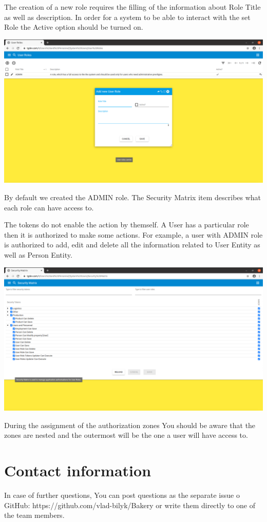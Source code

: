 The creation of a new role requires the filling of the information about Role Title as well as description. In order for a system to be able to interact with the set Role the Active option should be turned on.


\includegraphics[width=\textwidth]{sections/01-chapter/images/system14.png}

By default we created the ADMIN role. 
The Security Matrix item describes what each role can have access to. 

The tokens do not enable the action by themself. A User has a particular role then it is authorized to make some actions. For example, a user with ADMIN role is authorized to add, edit and delete all the information related to User Entity as well as Person Entity.  

\includegraphics[width=\textwidth]{sections/01-chapter/images/system155.png}

During the assignment of the authorization zones You should be aware that the zones are nested and the outermost will be the one a user will have access to. 

\section{Contact information}
In case of further questions, You can post questions as the separate issue o GitHub: https://github.com/vlad-bilyk/Bakery or write them directly to one of the team members. 

